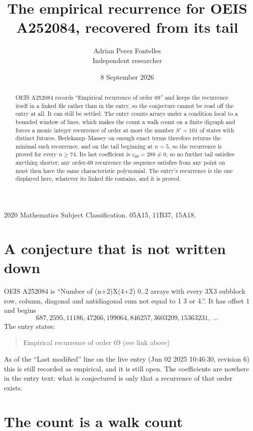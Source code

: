 \documentclass[11pt,a4paper]{article}
\title{The empirical recurrence for OEIS A252084, recovered from its tail}
\author{Adrian Perez Fontelles\\ \small Independent researcher}
\date{8 September 2026}
\theoremstyle{plain}
\theoremstyle{definition}
\begin{document}
\maketitle

\begin{abstract}
OEIS A252084 records ``Empirical recurrence of order $69$'' and keeps the recurrence itself in
a linked file rather than in the entry, so the conjecture cannot be read off the entry at all.
It can still be settled. The entry counts arrays under a condition local to a bounded window of
lines, which makes the count a walk count on a finite digraph and forces a monic integer
recurrence of order at most the number $S'=101$ of states with distinct futures. Berlekamp--Massey on
enough exact terms therefore returns the minimal such recurrence, and on the tail beginning at $n=5$, so the recurrence is proved for every $n\ge74$.
Its last coefficient is $c_{69}=288\neq0$, so no further tail satisfies anything
shorter; any order-$69$ recurrence the sequence satisfies from any point on must then have
the same characteristic polynomial. The entry's recurrence is the one displayed here, whatever
its linked file contains, and it is proved.
\end{abstract}

\noindent\small 2020 Mathematics Subject Classification. 05A15, 11B37, 15A18.\normalsize

\section{A conjecture that is not written down}

OEIS A252084 is ``Number of (n+2)X(4+2) 0..2 arrays with every 3X3 subblock row, column, diagonal and antidiagonal sum not equal to 1 3 or 4.''. It has offset $1$ and begins
\[
687, 2595, 11186, 47266, 199064, 846257, 3603209, 15363231,\ \dots
\]
The entry states:
\begin{quote}
Empirical recurrence of order 69 (see link above)
\end{quote}
As of the ``Last modified'' line on the live entry (Jun 02 2025 10:46:30, revision 6)
this is still recorded as empirical, and it is still open. The coefficients are nowhere in the
entry text: what is conjectured is only that a recurrence of that order exists.

\section{The count is a walk count}
\end{document}

